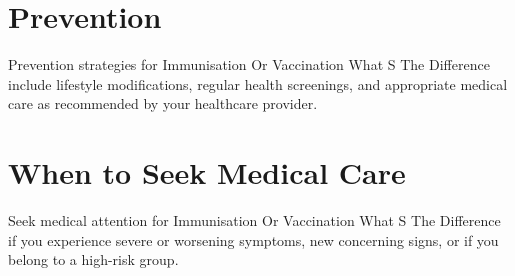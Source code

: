 \section*{Prevention}
Prevention strategies for Immunisation Or Vaccination What S The Difference include lifestyle modifications, regular health screenings, and appropriate medical care as recommended by your healthcare provider.

\section*{When to Seek Medical Care}
Seek medical attention for Immunisation Or Vaccination What S The Difference if you experience severe or worsening symptoms, new concerning signs, or if you belong to a high-risk group.
\clearpage
